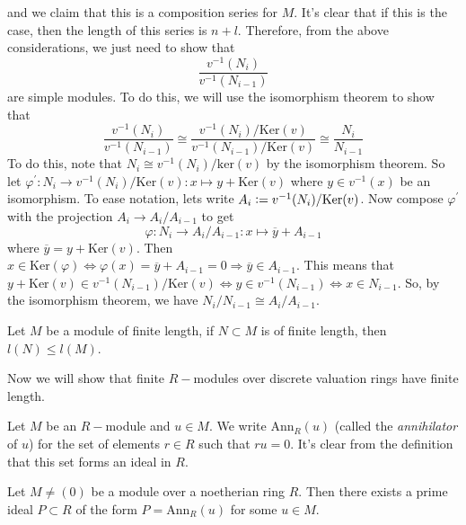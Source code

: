 and we claim that this is a composition series for $M$. It's clear that if this is the case, then the length of this series is $n+l$. Therefore, from the above considerations, we just need to show that 
\begin{equation}
    \frac{v^{-1}(N_i)}{v^{-1}(N_{i-1})} 
\end{equation}
are simple modules. To do this, we will use the isomorphism theorem to show that 
\begin{equation}
     \frac{v^{-1}(N_i)}{v^{-1}(N_{i-1})} \cong \frac{v^{-1}(N_i)/\text{Ker}(v)}{v^{-1}(N_{i-1})/\text{Ker}(v)}\cong\frac{N_i}{N_{i-1}} 
\end{equation}
To do this, note that $N_i\cong v^{-1}(N_i)/\text{ker}(v)$ by the isomorphism theorem. So let $\varphi^\prime: N_i\rightarrow v^{-1}(N_i)/\text{Ker}(v):x\mapsto y + \text{Ker}(v)$ where $y\in v^{-1}(x)$ be an isomorphism.  To ease notation, lets write $A_i\bydef v^{-1}(N_i)/\text{Ker}(v)$. Now compose $\varphi^\prime$ with the projection $A_i\rightarrow A_i/A_{i-1}$ to get
\begin{equation}
    \varphi: N_i\rightarrow A_i/A_{i-1}: x\mapsto \overline{y}+A_{i-1}
\end{equation}
where $\overline{y}= y + \text{Ker}(v)$. Then $x\in\text{Ker}(\varphi)\iff\varphi(x)=\overline{y}+A_{i-1}=0\Rightarrow \overline{y}\in A_{i-1}$. This means that $y+\text{Ker}(v)\in v^{-1}(N_{i-1})/\text{Ker}(v)\iff y\in  v^{-1}(N_{i-1})\iff x\in N_{i-1}$. So, by the isomorphism theorem, we have $N_i/N_{i-1}\cong A_i/A_{i-1}$.
\begin{dang}
    \begin{corollary}
        Let $M$ be a module of finite length, if $N\subset M$ is of finite length, then $l(N)\leq l(M)$.
    \end{corollary}
\end{dang}
Now we will show that finite $R-$modules over discrete valuation rings have finite length.
\begin{dang}
  \begin{definition}\cite{curtis1966representation}
      Let $M$ be an $R-$module and $u\in M$. We write $\text{Ann}_R(u)$ (called the \textit{annihilator} of $u$) for the set of elements $r\in R$ such that $ru=0$. It's clear from the definition that this set forms an ideal in $R$.
  \end{definition}
\end{dang}
\begin{dang}
    \begin{lemma}\label{existence_of_primeideals_that_annihilate_u}
    Let $M\neq (0)$ be a module over a noetherian ring $R$. 
    Then there exists a prime ideal $P\subset R$ of the form $P=\text{Ann}_R(u)$ for some $u\in M$.
    \end{lemma}
\end{dang}
